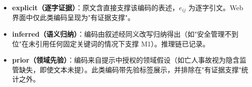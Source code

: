 \documentclass[11pt]{article}
\begin{document}
\begin{itemize}
\item \textbf{explicit{\cjkfont （\allowbreak 逐\allowbreak 字\allowbreak 证\allowbreak 据\allowbreak ）}}{\cjkfont ：\allowbreak 原\allowbreak 文\allowbreak 含\allowbreak 直\allowbreak 接\allowbreak 支\allowbreak 撑\allowbreak 该\allowbreak 编\allowbreak 码\allowbreak 的\allowbreak 表\allowbreak 述\allowbreak ，}$e_{ij}$ {\cjkfont 为\allowbreak 逐\allowbreak 字\allowbreak 引\allowbreak 文\allowbreak 。}Web {\cjkfont 界\allowbreak 面\allowbreak 中\allowbreak 仅\allowbreak 此\allowbreak 类\allowbreak 编\allowbreak 码\allowbreak 呈\allowbreak 现\allowbreak 为}"{\cjkfont 有\allowbreak 证\allowbreak 据\allowbreak 支\allowbreak 撑}"{\cjkfont 。}
\item \textbf{inferred{\cjkfont （\allowbreak 语\allowbreak 义\allowbreak 归\allowbreak 纳\allowbreak ）}}{\cjkfont ：\allowbreak 编\allowbreak 码\allowbreak 由\allowbreak 叙\allowbreak 述\allowbreak 经\allowbreak 同\allowbreak 义\allowbreak 改\allowbreak 写\allowbreak 归\allowbreak 纳\allowbreak 得\allowbreak 出\allowbreak （\allowbreak 如}"{\cjkfont 安\allowbreak 全\allowbreak 管\allowbreak 理\allowbreak 不\allowbreak 到\allowbreak 位}"{\cjkfont 在\allowbreak 未\allowbreak 引\allowbreak 用\allowbreak 任\allowbreak 何\allowbreak 固\allowbreak 定\allowbreak 关\allowbreak 键\allowbreak 词\allowbreak 的\allowbreak 情\allowbreak 况\allowbreak 下\allowbreak 支\allowbreak 撑} M1{\cjkfont ）\allowbreak 。\allowbreak 推\allowbreak 理\allowbreak 链\allowbreak 已\allowbreak 记\allowbreak 录\allowbreak 。}
\item \textbf{prior{\cjkfont （\allowbreak 领\allowbreak 域\allowbreak 先\allowbreak 验\allowbreak ）}}{\cjkfont ：\allowbreak 编\allowbreak 码\allowbreak 来\allowbreak 自\allowbreak 提\allowbreak 示\allowbreak 中\allowbreak 授\allowbreak 权\allowbreak 的\allowbreak 领\allowbreak 域\allowbreak 假\allowbreak 设\allowbreak （\allowbreak 如\allowbreak 亡\allowbreak 人\allowbreak 事\allowbreak 故\allowbreak 视\allowbreak 为\allowbreak 隐\allowbreak 含\allowbreak 监\allowbreak 管\allowbreak 缺\allowbreak 失\allowbreak ，\allowbreak 即\allowbreak 使\allowbreak 文\allowbreak 本\allowbreak 未\allowbreak 提\allowbreak ）\allowbreak 。\allowbreak 此\allowbreak 类\allowbreak 编\allowbreak 码\allowbreak 带\allowbreak 先\allowbreak 验\allowbreak 标\allowbreak 签\allowbreak 展\allowbreak 示\allowbreak ，\allowbreak 并\allowbreak 排\allowbreak 除\allowbreak 在}"{\cjkfont 有\allowbreak 证\allowbreak 据\allowbreak 支\allowbreak 撑}"{\cjkfont 统\allowbreak 计\allowbreak 之\allowbreak 外\allowbreak 。}
\end{itemize}
\end{document}
